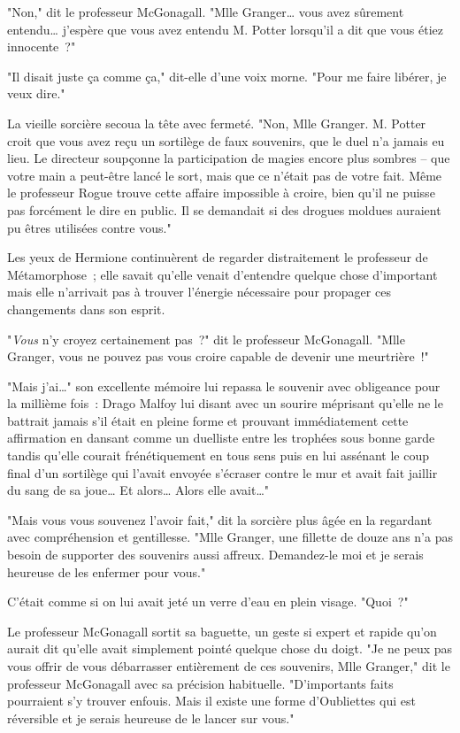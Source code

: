 "Non," dit le professeur McGonagall. "Mlle Granger… vous avez sûrement entendu… j'espère que vous avez entendu M. Potter lorsqu'il a dit que vous étiez innocente~?"

"Il disait juste ça comme ça," dit-elle d'une voix morne. "Pour me faire libérer, je veux dire."

La vieille sorcière secoua la tête avec fermeté. "Non, Mlle Granger. M. Potter croit que vous avez reçu un sortilège de faux souvenirs, que le duel n'a jamais eu lieu. Le directeur soupçonne la participation de magies encore plus sombres -- que votre main a peut-être lancé le sort, mais que ce n'était pas de votre fait. Même le professeur Rogue trouve cette affaire impossible à croire, bien qu'il ne puisse pas forcément le dire en public. Il se demandait si des drogues moldues auraient pu êtres utilisées contre vous."

Les yeux de Hermione continuèrent de regarder distraitement le professeur de Métamorphose~; elle savait qu'elle venait d'entendre quelque chose d'important mais elle n'arrivait pas à trouver l'énergie nécessaire pour propager ces changements dans son esprit.

"\emph{Vous} n'y croyez certainement pas~?" dit le professeur McGonagall. "Mlle Granger, vous ne pouvez pas vous croire capable de devenir une meurtrière~!"

"Mais j'ai…" son excellente mémoire lui repassa le souvenir avec obligeance pour la millième fois~: Drago Malfoy lui disant avec un sourire méprisant qu'elle ne le battrait jamais s'il était en pleine forme et prouvant immédiatement cette affirmation en dansant comme un duelliste entre les trophées sous bonne garde tandis qu'elle courait frénétiquement en tous sens puis en lui assénant le coup final d'un sortilège qui l'avait envoyée s'écraser contre le mur et avait fait jaillir du sang de sa joue… Et alors… Alors elle avait…"

"Mais vous vous souvenez l'avoir fait," dit la sorcière plus âgée en la regardant avec compréhension et gentillesse. "Mlle Granger, une fillette de douze ans n'a pas besoin de supporter des souvenirs aussi affreux. Demandez-le moi et je serais heureuse de les enfermer pour vous."

C'était comme si on lui avait jeté un verre d'eau en plein visage. "Quoi~?"

Le professeur McGonagall sortit sa baguette, un geste si expert et rapide qu'on aurait dit qu'elle avait simplement pointé quelque chose du doigt. "Je ne peux pas vous offrir de vous débarrasser entièrement de ces souvenirs, Mlle Granger," dit le professeur McGonagall avec sa précision habituelle. "D'importants faits pourraient s'y trouver enfouis. Mais il existe une forme d'Oubliettes qui est réversible et je serais heureuse de le lancer sur vous."

